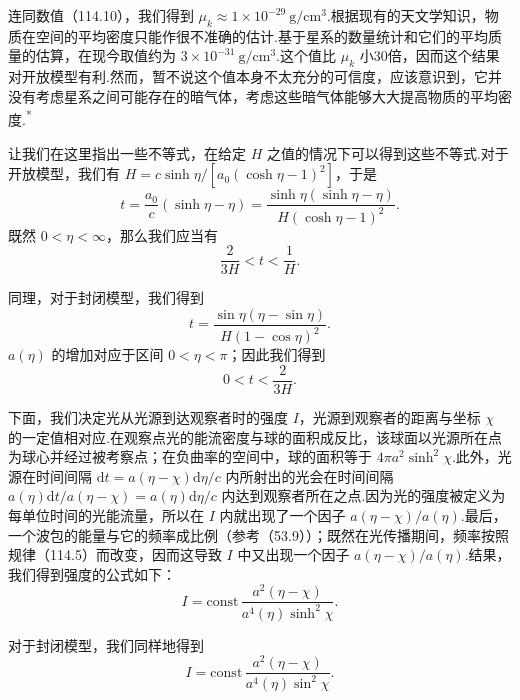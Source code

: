 连同数值（114.10），我们得到 $\mu_{k}\approx1\times10^{-29}\ \mathrm{g/cm^{3}}$.根据现有的天文学知识，物质在空间的平均密度只能作很不准确的估计.基于星系的数量统计和它们的平均质量的估算，在现今取值约为 $3\times10^{-31}\ \mathrm{g/cm^{3}}$.这个值比 $\mu_{k}$ 小30倍，因而这个结果对开放模型有利.然而，暂不说这个值本身不太充分的可信度，应该意识到，它并没有考虑星系之间可能存在的暗气体，考虑这些暗气体能够大大提高物质的平均密度.\textsuperscript{*}{\renewcommand{\thefootnote}{*}}

让我们在这里指出一些不等式，在给定 $H$ 之值的情况下可以得到这些不等式.对于开放模型，我们有 $H=c\sinh\eta/[a_{0}(\cosh\eta-1)^{2}]$，于是
\begin{equation*}
  t=\frac{a_{0}}{c}(\sinh\eta-\eta)
  =\frac{\sinh\eta(\sinh\eta-\eta)}{H(\cosh\eta-1)^{2}}.
\end{equation*}
既然 $0<\eta<\infty$，那么我们应当有
\begin{equation}
  \frac{2}{3H}<t<\frac{1}{H}.
\end{equation}

同理，对于封闭模型，我们得到
\begin{equation*}
  t=\frac{\sin\eta(\eta-\sin\eta)}{H(1-\cos\eta)^{2}}.
\end{equation*}
$a(\eta)$ 的增加对应于区间 $0<\eta<\pi$；因此我们得到
\begin{equation}
  0<t<\frac{2}{3H}.
\end{equation}

下面，我们决定光从光源到达观察者时的强度 $I$，光源到观察者的距离与坐标 $\chi$ 的一定值相对应.在观察点光的能流密度与球的面积成反比，该球面以光源所在点为球心并经过被考察点；在负曲率的空间中，球的面积等于 $4\pi a^{2}\sinh^{2}\chi$.此外，光源在时间间隔 $\mathrm{d}t=a(\eta-\chi)\mathrm{d}\eta/c$ 内所射出的光会在时间间隔 $a(\eta)\mathrm{d}t/a(\eta-\chi)=a(\eta)\mathrm{d}\eta/c$ 内达到观察者所在之点.因为光的强度被定义为每单位时间的光能流量，所以在 $I$ 内就出现了一个因子 $a(\eta-\chi)/a(\eta)$.最后，一个波包的能量与它的频率成比例（参考（53.9））；既然在光传播期间，频率按照规律（114.5）而改变，因而这导致 $I$ 中又出现一个因子 $a(\eta-\chi)/a(\eta)$.结果，我们得到强度的公式如下：
\begin{equation}
  I=\mathrm{const}\,\frac{a^{2}(\eta-\chi)}
  {a^{4}(\eta)\sinh^{2}\chi}.
\end{equation}

对于封闭模型，我们同样地得到
\begin{equation}
  I=\mathrm{const}\,\frac{a^{2}(\eta-\chi)}
  {a^{4}(\eta)\sin^{2}\chi}.
\end{equation}

